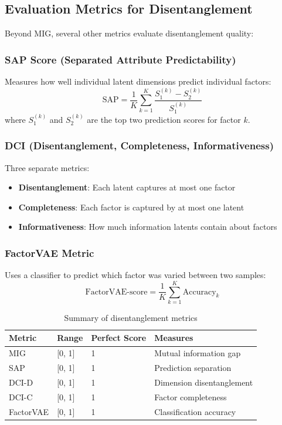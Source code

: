 \documentclass[conference]{IEEEtran}
\begin{document}
\subsection{Evaluation Metrics for Disentanglement}

Beyond MIG, several other metrics evaluate disentanglement quality:

\subsubsection{SAP Score (Separated Attribute Predictability)}

Measures how well individual latent dimensions predict individual factors:
\begin{equation}
\text{SAP} = \frac{1}{K} \sum_{k=1}^{K} \frac{S_1^{(k)} - S_2^{(k)}}{S_1^{(k)}}
\end{equation}
where $S_1^{(k)}$ and $S_2^{(k)}$ are the top two prediction scores for factor $k$.

\subsubsection{DCI (Disentanglement, Completeness, Informativeness)}

Three separate metrics:
\begin{itemize}
    \item \textbf{Disentanglement}: Each latent captures at most one factor
    \item \textbf{Completeness}: Each factor is captured by at most one latent
    \item \textbf{Informativeness}: How much information latents contain about factors
\end{itemize}

\subsubsection{FactorVAE Metric}

Uses a classifier to predict which factor was varied between two samples:
\begin{equation}
\text{FactorVAE-score} = \frac{1}{K} \sum_{k=1}^{K} \text{Accuracy}_k
\end{equation}

\begin{table}[!t]
\centering
\begin{tabular}{@{}llll@{}}
\toprule
\textbf{Metric} & \textbf{Range} & \textbf{Perfect Score} & \textbf{Measures} \\ \midrule
MIG & [0, 1] & 1 & Mutual information gap \\
SAP & [0, 1] & 1 & Prediction separation \\
DCI-D & [0, 1] & 1 & Dimension disentanglement \\
DCI-C & [0, 1] & 1 & Factor completeness \\
FactorVAE & [0, 1] & 1 & Classification accuracy \\ \bottomrule
\end{tabular}
\caption{Summary of disentanglement metrics}
\label{tab:disentangle_metrics}
\end{table}
\end{document}
